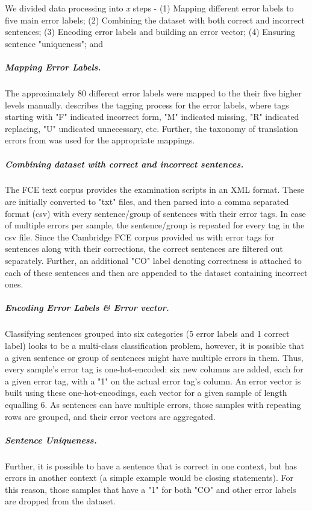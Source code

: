 We divided data processing into \emph{x} steps -
    (1) Mapping different error labels to five main error labels;
    (2) Combining the dataset with both correct and incorrect sentences; 
    (3) Encoding error labels and building an error vector;
    (4) Ensuring sentence "uniqueness"; and

\subparagraph{Mapping Error Labels.}
The approximately 80 different error labels were mapped to the their five higher 
levels manually. \cite{NichollsFce} describes the tagging process for the error labels, 
where tags starting with "F" indicated incorrect form, "M" indicated missing, "R" indicated replacing,
"U" undicated unnecessary, etc. Further, the taxonomy of translation errors from \cite{costaTaxonomyErrorLabels}
was used for the appropriate mappings. 

\subparagraph{Combining dataset with correct and incorrect sentences.}
The FCE text corpus provides the examination scripts in an XML format. These are initially converted to "txt" files, 
and then parsed into a comma separated format (csv) with every sentence/group of sentences with their error tags. 
In case of multiple errors per sample, the sentence/group is repeated for every tag in the csv file. 
Since the Cambridge FCE corpus provided us with error tags for sentences along with their 
corrections, the correct sentences are filtered out separately. Further, an additional "CO" label denoting correctness
is attached to each of these sentences and then are appended to the dataset containing incorrect ones.

\subparagraph{Encoding Error Labels \& Error vector.}
Classifying sentences grouped into six categories (5 error labels and 1 correct label) looks to be a multi-class 
classification problem, however, it is possible that a given sentence or group of sentences might have multiple errors 
in them. Thus, every sample's error tag is one-hot-encoded: six new columns are added, each for a given error tag, with 
a "1" on the actual error tag's column. An error vector is built using these one-hot-encodings, each vector for a given sample 
of length equalling 6. As sentences can have multiple errors, those samples with repeating rows are grouped, and their 
error vectors are aggregated. 

\subparagraph{Sentence Uniqueness.}
Further, it is possible to have a sentence that is correct in one context, but has errors in 
another context (a simple example would be closing statements). For this reason, those samples that have a "1" for both "CO" and 
other error labels are dropped from the dataset. 